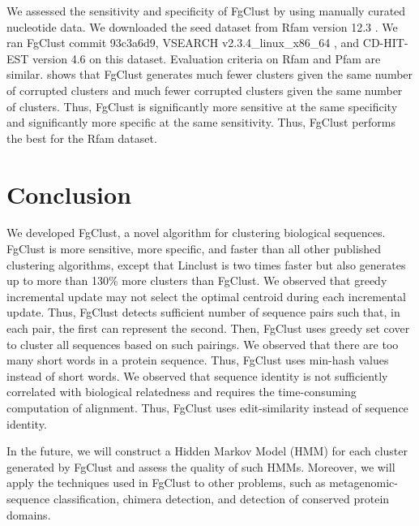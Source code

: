 \documentclass[11pt,letterpaper]{article}
\begin{document}
We assessed the sensitivity and specificity of FgClust by using manually curated nucleotide data. 
We downloaded the seed dataset from Rfam version 12.3 \citep{nawrocki2014rfam}.
We ran FgClust commit 93c3a6d9, VSEARCH v2.3.4\_linux\_x86\_64 \citep{rognes2016vsearch}, and CD-HIT-EST version 4.6 \citep{fu2012cd} on this dataset.
Evaluation criteria on Rfam and Pfam are similar.
 shows that FgClust generates much fewer clusters given the same number of corrupted clusters and much fewer corrupted clusters given the same number of clusters.
Thus, FgClust is significantly more sensitive at the same specificity and significantly more specific at the same sensitivity.
Thus, FgClust performs the best for the Rfam dataset.

\section{Conclusion}

We developed FgClust, a novel algorithm for clustering biological sequences.
FgClust is more sensitive, more specific, and faster than all other published clustering algorithms, except that Linclust is two times faster but also generates up to more than 130\% more clusters than FgClust.
We observed that greedy incremental update may not select the optimal centroid during each incremental update.
Thus, FgClust detects sufficient number of sequence pairs such that, in each pair, the first can represent the second.
Then, FgClust uses greedy set cover to cluster all sequences based on such pairings.
We observed that there are too many short words in a protein sequence.
Thus, FgClust uses min-hash values instead of short words.
We observed that sequence identity is not sufficiently correlated with biological relatedness and requires the time-consuming computation of alignment.
Thus, FgClust uses edit-similarity instead of sequence identity.

In the future, we will construct a Hidden Markov Model (HMM) for each cluster generated by FgClust and assess the quality of such HMMs.
Moreover, we will apply the techniques used in FgClust to other problems, such as metagenomic-sequence classification, chimera detection, and detection of conserved protein domains.



%

\end{document}
